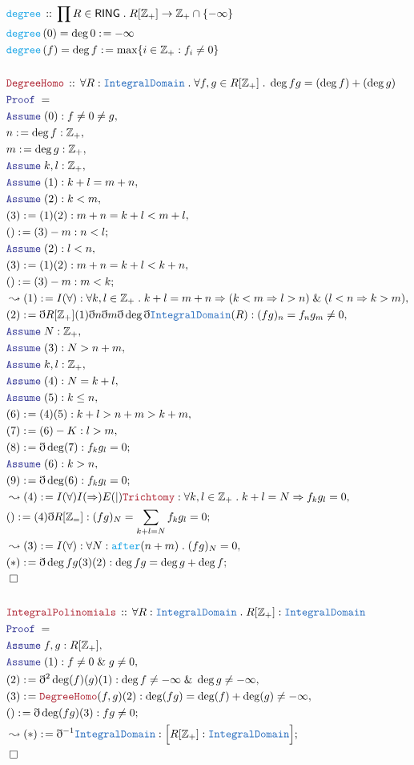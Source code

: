 \documentclass[12pt]{scrartcl}
\newcommand{\TYPE}[1]{\textcolor{NavyBlue}{\mathtt{#1}}}
\newcommand{\FUNC}[1]{\textcolor{Cerulean}{\mathtt{#1}}}
\newcommand{\LOGIC}[1]{\textcolor{Blue}{\mathtt{#1}}}
\newcommand{\THM}[1]{\textcolor{Maroon}{\mathtt{#1}}}
\renewcommand{\.}{\; . \;}
\newcommand{\de}{: \kern 0.1pc =}
\newcommand{\Act}[1]{\left( #1 \right)}
\newcommand{\Theorem}[2]{& \THM{#1} \, :: \, #2 \\ & \Proof = \\ }
\newcommand{\DeclareFunc}[2]{& \FUNC{#1} \, :: \, #2 \\}
\newcommand{\DefineNamedFunc}[4]{&  \FUNC{#1}\Act{#2} = #3 \de #4 \\}
\newcommand{\Page}[1]{ \begin{align*} #1 \end{align*}   }
\newcommand{ \bd }{ \ByDef }
\renewcommand{\And}{\; \& \;}
\newcommand{\Int}{\mathbb{Z} }
\newcommand{\Say}[3]{& #1 \de #2 : #3, \\}
\newcommand{\Conclude}[3]{& #1 \de #2 : #3; \\}
\newcommand{\Derive}[3]{& \leadsto #1 \de #2 : #3, \\}
\newcommand{\DeriveConclude}[3]{& \leadsto #1 \de #2 : #3 ; \\}
\newcommand{\Assume}[2]{& \LOGIC{Assume} \; #1 : #2, \\}
\newcommand{\QED}{\; \square}
\newcommand{\EndProof}{& \QED \\}
\newcommand{\ByDef}{\eth}
\newcommand{\Proof}{\LOGIC{Proof} \; }
\newcommand{\ID}{\TYPE{IntegralDomain}}
\newcommand{\RING}{\mathsf{RING}}
\begin{document}
\Page{
	\DeclareFunc{degree}{\prod R \in \RING \. R[\Int_+] \to \Int_+ \cap \{-\infty\} }
	\DefineNamedFunc{degree}{0}{\deg 0}{-\infty}
	\DefineNamedFunc{degree}{f}{\deg f}{\max \{ i \in \Int_+ : f_i \neq 0  \}}
	\\
	\Theorem{DegreeHomo}{\forall R : \ID \. \forall f,g \in R[\Int_+] \. \deg fg = (\deg f) + (\deg g) }
	\Assume{(0)}{f \neq 0 \neq g}
	\Say{n}{\deg f}{\Int_+}
	\Say{m}{\deg g}{\Int_+}
	\Assume{k,l}{\Int_+}
	\Assume{(1)}{k + l = m + n}
	\Assume{(2)}{ k < m}
	\Say{(3)}{(1)(2)}{ m + n = k + l < m + l}
	\Conclude{()}{(3) - m}{n < l}
	\Assume{(2)}{ l < n}
	\Say{(3)}{(1)(2)}{ m + n = k + l < k + n}
	\Conclude{()}{(3) - m}{m < k}
	\Derive{(1)}{I(\forall)}{\forall k,l \in \Int_+ \. k + l = m + n \Rightarrow (k < m \Rightarrow l > n) \And (l < n \Rightarrow k > m)}
	\Say{(2)}{\bd R[\Int_+](1)\bd n \bd m \bd \deg \bd \ID(R)}{(fg)_n = f_ng_m \neq 0  }
	\Assume{N}{\Int_+}
	\Assume{(3)}{N > n + m}
	\Assume{k,l}{\Int_+}
	\Assume{(4)}{N = k + l}
	\Assume{(5)}{k \le n}
	\Say{(6)}{(4)(5)}{k + l > n + m > k + m}
	\Say{(7)}{(6) - K }{l > m}
	\Conclude{(8)}{\bd \deg (7)}{f_kg_l = 0 }
	\Assume{(6)}{k > n}
	\Conclude{(9)}{\bd \deg (6)}{f_kg_l = 0}
	\Derive{(4)}{I(\forall)I(\Rightarrow)E(|)\THM{Trichtomy}}{ \forall k,l \in \Int_+ \. k+l=N\Rightarrow f_kg_l=0}
	\Conclude{()}{(4)\bd R[\Int_=]}{ (fg)_N = \sum_{k + l = N}f_kg_l = 0}
	\Derive{(3)}{I(\forall)}{ \forall N : \FUNC{after}(n + m) \. (fg)_N = 0  }
	\Conclude{(*)}{\bd \deg fg (3)(2)}{\deg fg =\deg g  + \deg f}
	\EndProof
	\\
	\Theorem{IntegralPolinomials}{\forall R : \ID \. R[\Int_+] : \ID}
	\Assume{f,g}{ R[\Int_+]  }
	\Assume{(1)}{f \neq 0 \And g \neq 0}
	\Say{(2)}{\bd^2 \deg (f)(g)(1)}{\deg f \neq -\infty \And \deg g \neq -\infty}
	\Say{(3)}{ \THM{DegreeHomo}(f,g)(2)  }{\deg(fg) = \deg(f) + \deg(g) \neq -\infty}
	\Conclude{()}{ \bd \deg(fg)(3)  }{fg \neq 0}
	\DeriveConclude{(*)}{\bd^{-1}\ID}{ \Big[R[\Int_+] : \ID\Big]}
	\EndProof
}
\end{document}
